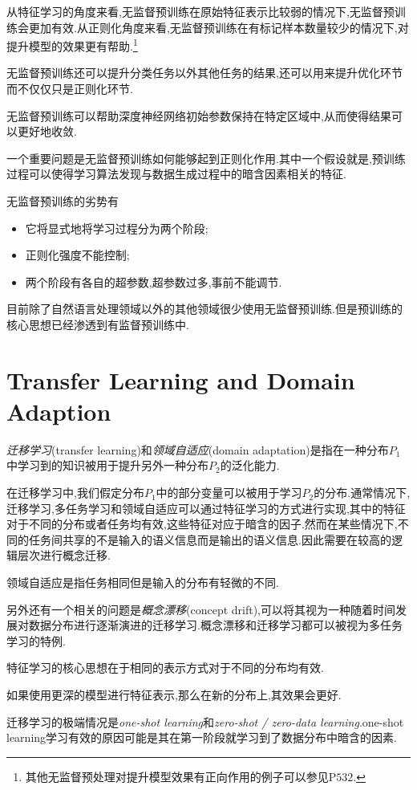 从特征学习的角度来看,无监督预训练在原始特征表示比较弱的情况下,无监督预训练会更加有效.从正则化角度来看,无监督预训练在有标记样本数量较少的情况下,对提升模型的效果更有帮助.\footnote{其他无监督预处理对提升模型效果有正向作用的例子可以参见P$532$.}

无监督预训练还可以提升分类任务以外其他任务的结果,还可以用来提升优化环节而不仅仅只是正则化环节.

无监督预训练可以帮助深度神经网络初始参数保持在特定区域中,从而使得结果可以更好地收敛.

一个重要问题是无监督预训练如何能够起到正则化作用.其中一个假设就是,预训练过程可以使得学习算法发现与数据生成过程中的暗含因素相关的特征.

无监督预训练的劣势有
\begin{itemize}
    \item 它将显式地将学习过程分为两个阶段;
    \item 正则化强度不能控制;
    \item 两个阶段有各自的超参数,超参数过多,事前不能调节.
\end{itemize}

目前除了自然语言处理领域以外的其他领域很少使用无监督预训练.但是预训练的核心思想已经渗透到有监督预训练中.

\section{Transfer Learning and Domain Adaption}

\textit{迁移学习}(transfer learning)和\textit{领域自适应}(domain adaptation)是指在一种分布$P_1$中学习到的知识被用于提升另外一种分布$P_2$的泛化能力.

在迁移学习中,我们假定分布$P_1$中的部分变量可以被用于学习$P_2$的分布.通常情况下,迁移学习,多任务学习和领域自适应可以通过特征学习的方式进行实现,其中的特征对于不同的分布或者任务均有效,这些特征对应于暗含的因子.然而在某些情况下,不同的任务间共享的不是输入的语义信息而是输出的语义信息.因此需要在较高的逻辑层次进行概念迁移.

领域自适应是指任务相同但是输入的分布有轻微的不同.

另外还有一个相关的问题是\textit{概念漂移}(concept drift),可以将其视为一种随着时间发展对数据分布进行逐渐演进的迁移学习.概念漂移和迁移学习都可以被视为多任务学习的特例.

特征学习的核心思想在于相同的表示方式对于不同的分布均有效.

如果使用更深的模型进行特征表示,那么在新的分布上,其效果会更好.

迁移学习的极端情况是\textit{one-shot learning}和\textit{zero-shot / zero-data learning}.one-shot learning学习有效的原因可能是其在第一阶段就学习到了数据分布中暗含的因素.

